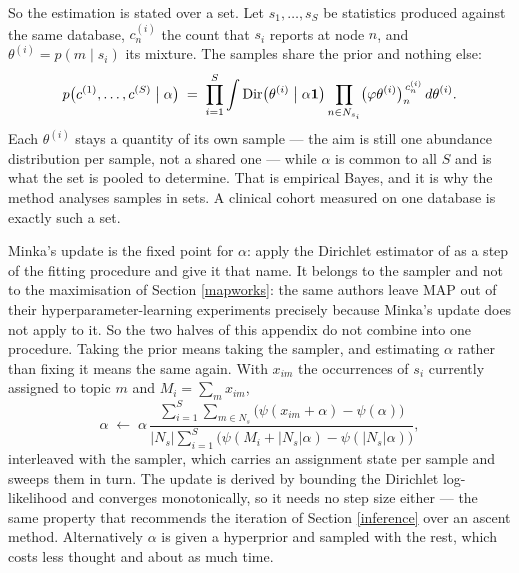 \documentclass[pdflatex,sn-vancouver-num]{sn-jnl}
\begin{document}
\begin{appendices}
    So the estimation is stated over a set. Let $s_1, \dots, s_S$ be statistics produced against the
    same database, $c^{(i)}_n$ the count that $s_i$ reports at node $n$, and
    $\theta^{(i)} = p(m \mid s_i)$ its mixture. The samples share the prior and nothing else:
    \begin{equation}\label{smoothyjoint}
        p\bigl(c^{(1)}, \dots, c^{(S)} \bigm| \alpha\bigr) \;=\; \prod_{i=1}^{S} \int
            \mathrm{Dir}\bigl(\theta^{(i)} \bigm| \alpha \mathbf{1}\bigr)
            \prod_{n \in N_{s_i}} \bigl(\varphi\theta^{(i)}\bigr)_n^{\,c^{(i)}_n} \, d\theta^{(i)} .
    \end{equation}
    Each $\theta^{(i)}$ stays a quantity of its own sample --- the aim is still one abundance
    distribution per sample, not a shared one --- while $\alpha$ is common to all $S$ and is what the
    set is pooled to determine. That is empirical Bayes, and it is why the method analyses samples in
    sets. A clinical cohort measured on one database is exactly such a set.

    Minka's update is the fixed point for $\alpha$: \citet{asuncion2009smoothing} apply the Dirichlet
    estimator of \citet{minka2000dirichlet} as a step of the fitting procedure and give it that name.
    It belongs to the sampler and not to the maximisation of Section \ref{mapworks}: the same authors
    leave MAP out of their hyperparameter-learning experiments precisely because Minka's update does
    not apply to it. So the two halves of this appendix do not combine into one procedure. Taking the
    prior means taking the sampler, and estimating $\alpha$ rather than fixing it means the same
    again. With $x_{im}$ the
    occurrences of $s_i$ currently assigned to topic $m$ and $M_i = \sum_m x_{im}$,
    \begin{equation}\label{smoothyalpha}
        \alpha \;\longleftarrow\; \alpha \,
            \frac{\sum_{i=1}^{S} \sum_{m \in N_s} \bigl( \psi(x_{im} + \alpha) - \psi(\alpha) \bigr)}
                 {\lvert N_s \rvert \sum_{i=1}^{S} \bigl( \psi(M_i + \lvert N_s \rvert \alpha)
                     - \psi(\lvert N_s \rvert \alpha) \bigr)} ,
    \end{equation}
    interleaved with the sampler, which carries an assignment state per sample and sweeps them in
    turn. The update is derived by bounding the Dirichlet log-likelihood and converges monotonically,
    so it needs no step size either --- the same property that recommends the iteration of
    Section \ref{inference} over an ascent method. Alternatively $\alpha$ is given a hyperprior and
    sampled with the rest, which costs less thought and about as much time.


\end{appendices}
\end{document}
